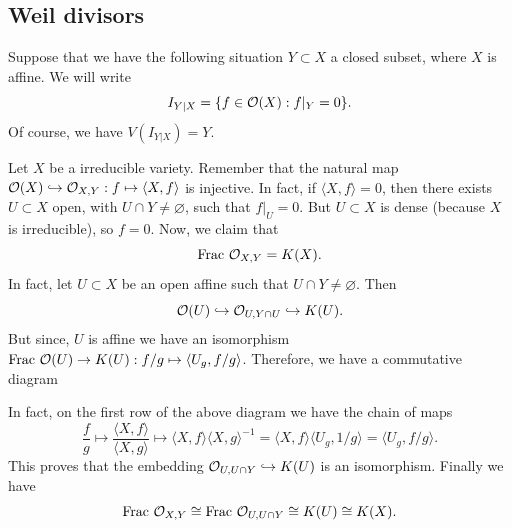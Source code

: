 \subsection{Weil divisors}
\begin{notation}
    Suppose that we have the following situation $Y\subset X$ a closed subset, where $X$ is affine. We will write 
    \begin{equation}
        I_{Y|X} = \{f\in\mathcal{O}(X): f|_Y=0\}.
    \end{equation}
    Of course, we have $V(I_{Y|X})=Y$.
\end{notation}

Let $X$ be a irreducible variety.
Remember that the natural map $\mathcal{O}(X)\hookrightarrow \mathcal{O}_{X,Y}:f\mapsto \langle X,f\rangle$ is injective. 
In fact, if $\langle X,f\rangle = 0$, then there exists $U\subset X$ open, with $U\cap Y\neq\varnothing$, such that 
$f|_U=0$. But $U\subset X$ is dense (because $X$ is irreducible), so $f=0$. Now, we claim that 
\begin{equation}
    \text{Frac }\mathcal{O}_{X,Y} = K(X).
\end{equation}
In fact, let $U\subset X$ be an open affine such that $U\cap Y\neq\varnothing$. Then 
\begin{equation}
    \mathcal{O}(U) \hookrightarrow \mathcal{O}_{U,Y\cap U}\hookrightarrow K(U).
\end{equation}
But since, $U$ is affine we have an isomorphism $\text{Frac }\mathcal{O}(U) \to K(U): f/g\mapsto \langle U_g, f/g\rangle$.
Therefore, we have a commutative diagram
\begin{center}
\end{center}
In fact, on the first row of the above diagram we have the chain of maps 
\begin{equation}
    \frac{f}{g}\mapsto \frac{\langle X,f\rangle}{\langle X,g\rangle}\mapsto 
    \langle X,f\rangle\langle X,g\rangle^{-1} = \langle X,f\rangle \langle U_g, 1/g\rangle = \langle U_g, f/g\rangle.
\end{equation}
This proves that the embedding $\mathcal{O}_{U,U\cap Y}\hookrightarrow  K(U)$ is an isomorphism. Finally we have 
\begin{equation}
    \text{Frac }\mathcal{O}_{X,Y} \cong \text{Frac }\mathcal{O}_{U,U\cap Y} \cong K(U)\cong K(X).
\end{equation}
